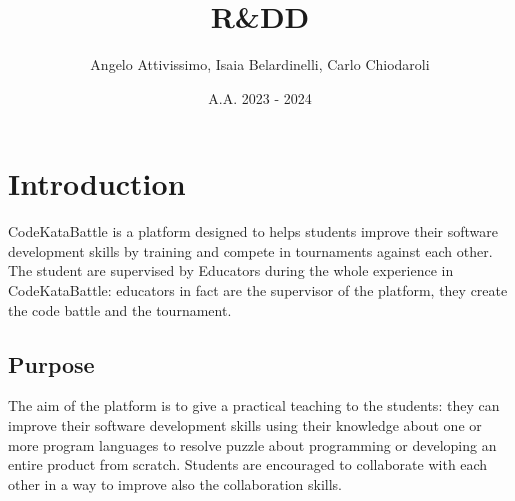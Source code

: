 \documentclass{article}
\title{R&DD}
\author{Angelo Attivissimo, Isaia Belardinelli, Carlo Chiodaroli}
\date{A.A. 2023 - 2024}
\begin{document}
\maketitle

\section{Introduction}
CodeKataBattle is a platform designed to helps students improve their software development skills by training and compete in tournaments against each other. The student are supervised by Educators during the whole experience in CodeKataBattle: educators in fact are the supervisor of the platform, they create the code battle and the tournament.
\subsection{Purpose}
The aim of the platform is to give a practical teaching to the students: they can improve their software development skills using their knowledge about one or more program languages to resolve puzzle about programming or developing an entire product from scratch. Students are encouraged to collaborate with each other in a way to improve also the collaboration skills.
\end{document}
